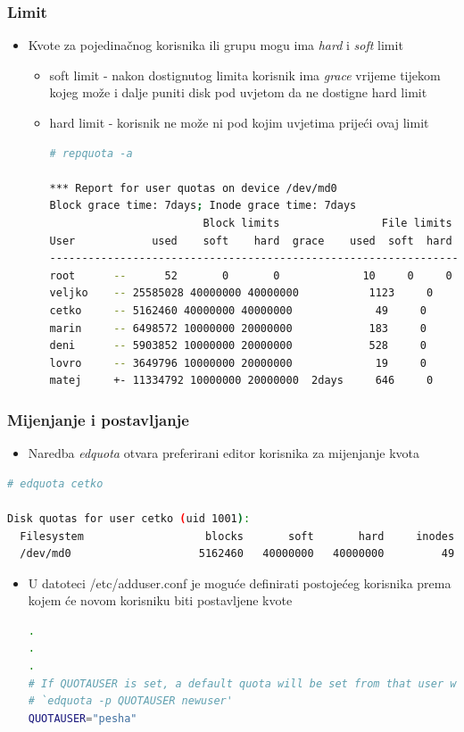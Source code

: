\documentclass[croatian,t]{beamer} %
\begin{document}
	\begin{frame}[fragile]
	\frametitle{Limit}
		\begin{itemize}
			\item Kvote za pojedinačnog korisnika ili grupu mogu ima \textit{hard} i \textit{soft} limit
			\begin{itemize}
				\item soft limit - nakon dostignutog limita korisnik ima \textit{grace} vrijeme tijekom kojeg može i dalje puniti disk pod uvjetom da ne dostigne hard limit
				\item hard limit - korisnik ne može ni pod kojim uvjetima prijeći ovaj limit
			\begin{lstlisting}[basicstyle={\tiny\ttfamily},language=bash]
# repquota -a

*** Report for user quotas on device /dev/md0
Block grace time: 7days; Inode grace time: 7days
                        Block limits                File limits
User            used    soft    hard  grace    used  soft  hard  grace
----------------------------------------------------------------------
root      --      52       0       0             10     0     0       
veljko    -- 25585028 40000000 40000000           1123     0     0       
cetko     -- 5162460 40000000 40000000             49     0     0       
marin     -- 6498572 10000000 20000000            183     0     0       
deni      -- 5903852 10000000 20000000            528     0     0       
lovro     -- 3649796 10000000 20000000             19     0     0       
matej     +- 11334792 10000000 20000000  2days     646     0     0       
			\end{lstlisting}	
			\end{itemize}
		\end{itemize}
	\end{frame}
	
	\begin{frame}[fragile]
	\frametitle{Mijenjanje i postavljanje}
		\begin{itemize}
			\item Naredba \textit{edquota} otvara preferirani editor korisnika za mijenjanje kvota
		\end{itemize}
		\begin{lstlisting}[basicstyle={\tiny\ttfamily},language=bash]
# edquota cetko

Disk quotas for user cetko (uid 1001):
  Filesystem                   blocks       soft       hard     inodes     soft     hard
  /dev/md0                    5162460   40000000   40000000         49        0        0     
		\end{lstlisting}
		\begin{itemize}
			\item U datoteci /etc/adduser.conf je moguće definirati postojećeg korisnika prema kojem će novom korisniku biti postavljene kvote
			\begin{lstlisting}[basicstyle={\tiny\ttfamily},language=bash]
.
.
.
# If QUOTAUSER is set, a default quota will be set from that user with
# `edquota -p QUOTAUSER newuser'
QUOTAUSER="pesha"
			\end{lstlisting}
		\end{itemize}
	\end{frame}	
	
\end{document}
